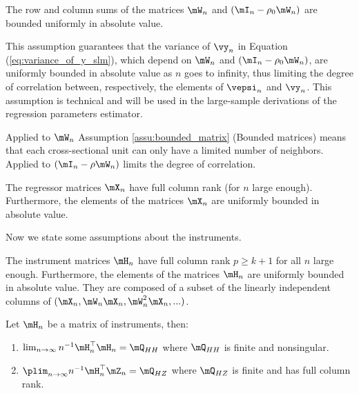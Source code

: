 \documentclass[english,12pt]{book}\usepackage[]{graphicx}\usepackage[]{xcolor}
\begin{document}
\begin{assumption}\label{assu:bounded_matrix}
The row and column sums of the matrices $\mW_n$ and $(\mI_n - \rho_0\mW_n)$ are bounded uniformly in absolute value.
\end{assumption}


This assumption guarantees that the variance of $\vy_n$  in Equation (\ref{eq:variance_of_y_slm}), which depend on $\mW_n$ and $(\mI_n - \rho_0\mW_n)$, are uniformly bounded in absolute value as $n$ goes to infinity, thus limiting the degree of correlation between, respectively, the elements of $\vepsi_n$ and $\vy_n$. This assumption is technical and will be used in the large-sample derivations of the regression parameters estimator. 

\begin{remark}
Applied to $\mW_n$ Assumption \ref{assu:bounded_matrix} (Bounded matrices) means that each cross-sectional unit can only have a limited number of neighbors. Applied to $\left(\mI_n - \rho \mW_n\right)$ limits the degree of correlation. 
\end{remark}


\begin{assumption}\label{assu:regressors}
The regressor matrices $\mX_n$ have full column rank (for $n$ large enough). Furthermore, the elements of the matrices $\mX_n$ are uniformly bounded in absolute value.
\end{assumption}

Now we state some assumptions about the instruments.

\begin{assumption}\label{assu:iv_instr}
The instrument matrices $\mH_n$ have full column rank $p \geq k + 1$ for all $n$ large enough. Furthermore, the elements of the matrices $\mH_n$ are uniformly bounded in absolute value. They are composed of a subset of the linearly independent columns of $(\mX_n, \mW_n\mX_n, \mW^2_n\mX_n, ...)$.
\end{assumption}

\begin{assumption}\label{assu:iv_instr_lim}
Let $\mH_n$ be a matrix of instruments, then:

\begin{enumerate}
  \item $\lim_{n\to \infty} n^{-1}\mH_n^\top\mH_n = \mQ_{HH}$ where $\mQ_{HH}$ is finite and nonsingular. 
  \item $\plim_{n\to \infty} n^{-1}\mH_n^\top\mZ_n = \mQ_{HZ}$ where $\mQ_{HZ}$ is finite and has full column rank.
\end{enumerate}
\end{assumption}
\end{document}
